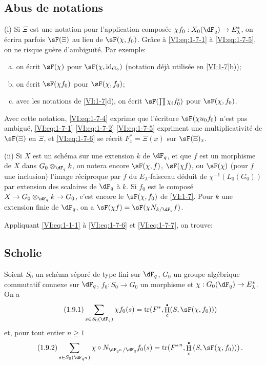 \documentclass[oneside]{book}
\DeclareMathOperator{\h}{H}
\DeclareMathOperator{\tr}{tr}
\theoremstyle{sga-source}
\theoremstyle{sga-source-dash}
\theoremstyle{sga-source-dotdash}
\theoremstyle{sga-source-number-note-dash}
\theoremstyle{sga-source-note-number-dotdash}
\theoremstyle{sga-source-example-dotdash}
\theoremstyle{sga-source-inline-number}
\theoremstyle{sga-source-bare-number}
\theoremstyle{sga-source}
\let\oldbullet\bullet
\renewcommand{\bullet}{\textnormal{\tiny$\oldbullet$}}
\newcommand{\PrintPage}[1]{}\newcommand{\MathPage}[1]{}\newcommand{\PrintCite}[2]{#1}\newcommand{\var}[3]{#2}
\begin{document}
\subsection{Abus de notations}\label{VI:1-8}

(i) Si $\Xi$ est une notation pour l'application composée 
$\chi f_0:X_0(\dF_q) \to E_\lambda^\ast$, on écrira parfois $\sF(\Xi)$ au 
lieu de $\sF(\chi,f_0)$. Grâce à \eqref{VI:eq:1-7-1} à \eqref{VI:eq:1-7-5}, 
on ne risque guère d'ambiguïté. Par exemple:
\begin{enumerate}[a)]
  \item on écrit $\sF(\chi)$ pour $\sF(\chi,\operatorname{id}_{G_0})$ 
    (notation déjà utilisée en \ref{VI:1-7}b)); 
  \item on écrit $\sF(\chi f_0)$ pour $\sF(\chi,f_0)$;
  \item avec les notations de \ref{VI:1-7}d), on écrit 
    $\sF(\prod \chi_i f_0^i)$ pour $\var{\sF(\chi,f)}{\sF(\chi,f_0)}{S45-SOL-0690}$. 
\end{enumerate}

\PrintPage{174}
Avec cette notation, \eqref{VI:eq:1-7-4} exprime que l'écriture 
$\sF(\chi u_0 f_0)$ n'est pas ambiguë, \eqref{VI:eq:1-7-1} \eqref{VI:eq:1-7-2} 
\eqref{VI:eq:1-7-5} expriment une multiplicativité de $\sF(\Xi)$ en $\Xi$, 
et \eqref{VI:eq:1-7-6} se récrit $F_x^\ast = \Xi(x)$ sur $\sF(\Xi)_x$.

(ii) Si $X$ est un schéma sur une extension $k$ de $\dF_q$, et que $f$ est un 
morphisme de $X$ dans $G_0\otimes_{\dF_q} k$, on notera encore $\sF(\chi,f)$, 
$\sF(\chi f)$, ou $\sF(\chi)$ (pour $f$ une inclusion) l'image réciproque par 
$f$ du $E_\lambda$-faisceau déduit de $\chi^{-1}(L_0(G_0))$ par extension des 
scalaires de $\dF_q$ à $k$. Si $f_0$ est le composé 
$X\to G_0\otimes_{\dF_q} k \to G_0$, c'est encore le $\sF(\chi,f_0)$ de 
\ref{VI:1-7}. \var{Pour $k$ est une extension}{Pour $k$ une extension}{S45-SOL-0692} finie de $\dF_q$, on a 
$\sF(\chi f) = \sF(\chi N_{k/\dF_q} f)$. 

Appliquant \eqref{VI:eq:1-1-1} à \eqref{VI:eq:1-7-6} et \eqref{VI:eq:1-7-7}, 
on trouve: 





\subsection{Scholie}\label{VI:1-9}
Soient $S_0$ un schéma séparé de type fini sur $\dF_q$, $G_0$ un groupe 
algébrique commutatif connexe sur $\dF_q$, $f_0:S_0\to G_0$ un morphisme et 
$\chi:G_0(\dF_q) \to E_\lambda^\ast$. On a 
\begin{equation*}\tag{1.9.1}\label{VI:eq:1-9-1}
  \sum_{s\in S_0(\dF_q)} \chi f_0(s) = \tr(F^\ast,\h_c^\bullet(S,\sF(\chi,f_0))) 
\end{equation*}
et, pour tout entier $n\geqslant 1$
\begin{equation*}\tag{1.9.2}\label{VI:eq:1-9-2}
  \sum_{s\in S_0(\dF_{q^n})} \chi\circ N_{\dF_{q^n}/\dF_q} f_0(s) = \tr({F^\ast}^n, \h_c^\bullet\left(S,\sF(\chi,f_0))\right) \text{.}
\end{equation*}
\end{document}
